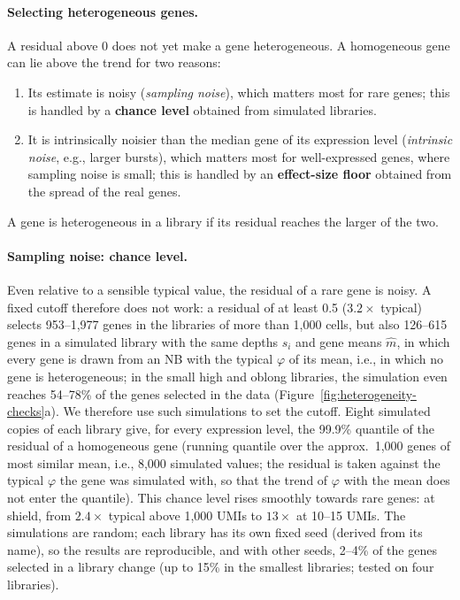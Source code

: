 \documentclass[11pt,a4paper]{article}
\begin{document}
\paragraph{Selecting heterogeneous genes.} A residual above 0 does not yet make a gene heterogeneous. A homogeneous gene can lie above the trend for two reasons:
\begin{enumerate}
	\item Its estimate is noisy (\emph{sampling noise}), which matters most for rare genes; this is handled by a \textbf{chance level} obtained from simulated libraries.
	\item It is intrinsically noisier than the median gene of its expression level (\emph{intrinsic noise}, e.g., larger bursts), which matters most for well-expressed genes, where sampling noise is small; this is handled by an \textbf{effect-size floor} obtained from the spread of the real genes.
\end{enumerate}
A gene is heterogeneous in a library if its residual reaches the larger of the two.

\paragraph{Sampling noise: chance level.} Even relative to a sensible typical value, the residual of a rare gene is noisy. A fixed cutoff therefore does not work: a residual of at least 0.5 ($3.2\times$ typical) selects 953--1{,}977 genes in the libraries of more than 1{,}000 cells, but also 126--615 genes in a simulated library with the same depths $s_i$ and gene means $\hat m$, in which every gene is drawn from an NB with the typical $\varphi$ of its mean, i.e., in which no gene is heterogeneous; in the small high and oblong libraries, the simulation even reaches 54--78\% of the genes selected in the data (Figure~\ref{fig:heterogeneity-checks}a). We therefore use such simulations to set the cutoff. Eight simulated copies of each library give, for every expression level, the 99.9\% quantile of the residual of a homogeneous gene (running quantile over the approx.~1{,}000 genes of most similar mean, i.e., 8{,}000 simulated values; the residual is taken against the typical $\varphi$ the gene was simulated with, so that the trend of $\varphi$ with the mean does not enter the quantile). This chance level rises smoothly towards rare genes: at shield, from $2.4\times$ typical above 1{,}000 UMIs to $13\times$ at 10--15 UMIs. The simulations are random; each library has its own fixed seed (derived from its name), so the results are reproducible, and with other seeds, 2--4\% of the genes selected in a library change (up to 15\% in the smallest libraries; tested on four libraries).
\end{document}
